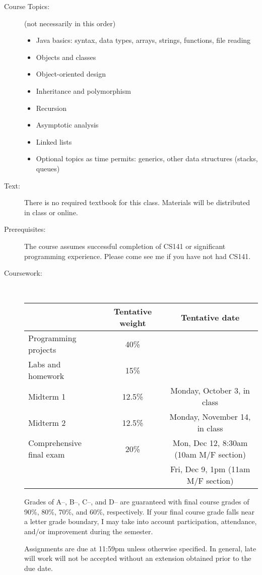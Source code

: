 \documentclass [letterpaper,11pt]{article}
\begin{document}
\begin{description}
\item[Course Topics:] (not necessarily in this order) 
\begin{itemize} \setlength{\itemsep}{0em}\setlength{\parskip}{0pt}
	\item Java basics: syntax, data types, arrays, strings, functions, file reading
	\item Objects and classes
	\item Object-oriented design
	\item Inheritance and polymorphism
	\item Recursion
	\item Asymptotic analysis
	\item Linked lists
	\item Optional topics as time permits: generics, other data structures (stacks, queues)
	\end{itemize}



\item[Text:]
   There is no required textbook for this class.  Materials will be distributed in class
   or online.  

\item[Prerequisites:]
The course assumes successful completion of CS141 or significant programming experience.  Please come see me if you have not had CS141.

\item[Coursework:] \

\begin{tabular}{lcc} 
& Tentative weight & Tentative date \\ \hline
Programming projects & 40\% & \\
Labs and homework & 15\% & \\
Midterm 1 & 12.5\% & Monday, October 3, in class \\
Midterm 2 & 12.5\% & Monday, November 14, in class\\
Comprehensive final exam & 20\% & Mon, Dec 12, 8:30am (10am M/F section)\\
 && Fri, Dec 9, 1pm (11am M/F section)
\end{tabular}

Grades of A--, B--, C--, and D-- are guaranteed with final course grades of 90\%, 80\%,
70\%, and 60\%, respectively.  If your final course grade falls near a letter grade boundary,
I may take into account participation, attendance, and/or improvement during the semester.

Assignments are due at 11:59pm unless otherwise specified.  In general, late will work
will not be accepted without an extension obtained prior to the due date.


\end{description}
\end{document}
